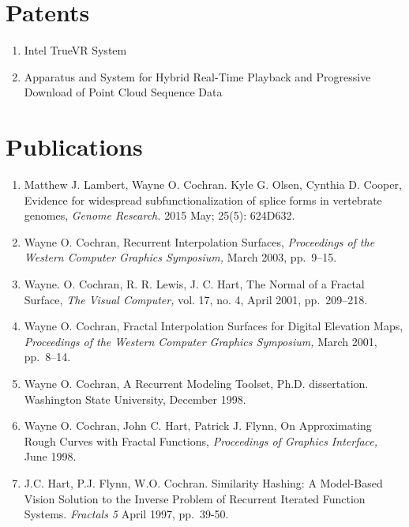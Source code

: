 \documentclass[10pt]{article}
\begin{document}
\section*{Patents}

\begin{enumerate}
\item Intel TrueVR System
\item Apparatus and System for Hybrid Real-Time Playback and Progressive
  Download of Point Cloud Sequence Data
\end{enumerate}

\section*{Publications}

\begin{enumerate}

\item Matthew J. Lambert, Wayne O. Cochran. Kyle G. Olsen, Cynthia D. Cooper,
  Evidence for widespread subfunctionalization of splice forms in vertebrate genomes,
  {\em Genome Research.} 2015 May; 25(5): 624D632.

\item Wayne O. Cochran,
Recurrent Interpolation Surfaces,
{\em Proceedings of the Western Computer Graphics Symposium,}
March 2003, pp.~9--15.

\item Wayne. O. Cochran, R. R. Lewis, J. C. Hart,
The Normal of a Fractal Surface,
{\em The Visual Computer,} vol. 17, no. 4, April 2001, pp.~209--218.

\item Wayne O. Cochran,
Fractal Interpolation Surfaces for Digital Elevation Maps,
{\em Proceedings of the Western Computer Graphics Symposium,}
March 2001, pp.~8--14.

\item Wayne O. Cochran,
A Recurrent Modeling Toolset, Ph.D. dissertation.
Washington State University, December 1998.

\item
Wayne O. Cochran, John C. Hart, Patrick J. Flynn,
On Approximating Rough Curves with Fractal Functions,
{\em Proceedings of Graphics Interface,}
June 1998.

\item
J.C. Hart, P.J. Flynn, W.O. Cochran. 
Similarity Hashing: A Model-Based Vision Solution to the Inverse 
Problem of Recurrent Iterated Function Systems. 
{\em Fractals 5} April 1997, pp.~39-50.


\end{enumerate}
\end{document}
